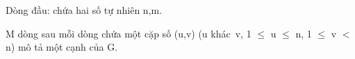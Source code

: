 Dòng đầu: chứa hai số tự nhiên n,m.

M dòng sau mỗi dòng chứa một cặp số (u,v) (u khác v, 1  $\le$  u  $\le$  n, 1  $\le$  v $<$ n) mô tả một cạnh của G.